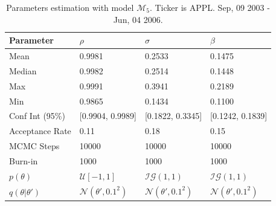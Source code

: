 \documentclass[11pt,a4,twosided,singlespacing,titlepagenumber=on]{scrreprt}
\numberwithin{equation}{chapter} %
\theoremstyle{remark}
\begin{document}
\begin{table}[H]
\centering
\begin{tabular}{llll}
Parameter      	& $\rho$ & $\sigma$ & $\beta$ \\ 
\hline
Mean            & 0.9981              & 0.2533             & 0.1475\\
Median          & 0.9982              & 0.2514             & 0.1448\\
Max             & 0.9991              & 0.3941             & 0.2189\\
Min             & 0.9865              & 0.1434             & 0.1100\\
Conf Int (95\%) & [0.9904, 0.9989]    & [0.1822, 0.3345]   & [0.1242, 0.1839]\\
Acceptance Rate & 0.11                & 0.18               & 0.15 \\
MCMC Steps      & 10000               & 10000              & 10000 \\
Burn-in         & 1000                & 1000               & 1000 \\
$p(\theta)$     & $\mathcal{U}[-1,1]$   & $\mathcal{IG}(1,1)$  & $\mathcal{IG}(1,1)$     \\
$q(\theta|\theta')$& $\mathcal{N}(\theta', 0.1^2)$ & $\mathcal{N}(\theta', 0.1^2)$ & $\mathcal{N}(\theta', 0.1^2)$     \\
\hline
\end{tabular}
\caption{Parameters estimation with model $\mathcal{M}_5$. Ticker is APPL. Sep, 09 2003 - Jun, 04 2006.}
\label{est_appl_params}
\end{table}
\end{document}

